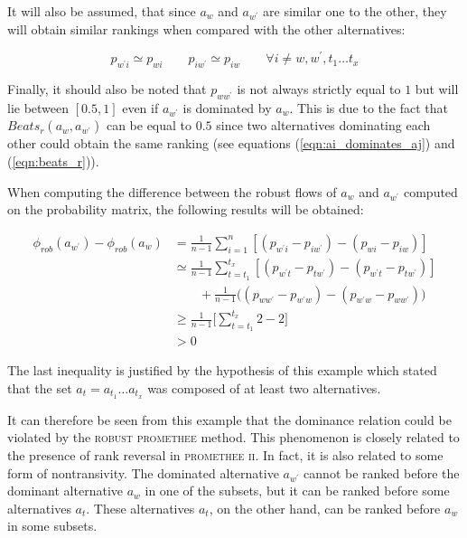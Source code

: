 It will also be assumed, that since $a_w$ and $a_{w^{\prime}}$ are similar one to the other, they will obtain similar rankings when compared with the other alternatives:

\begin{equation}
        p_{{w^{\prime}}i} \simeq p_{wi} \qquad p_{i{w^{\prime}}} \simeq p_{iw}   \qquad   \forall i \neq w, {w^{\prime}}, t_1 \dots t_x
    \label{eqn:p_wt}
\end{equation}

Finally, it should also be noted that $p_{ww^\prime}$ is not always strictly equal to $1$ but will lie between $[0.5, 1]$ even if $a_{w^\prime}$ is dominated by $a_w$.
This is due to the fact that $Beats_r(a_w, a_{w^\prime})$ can be equal to $0.5$ since two alternatives dominating each other could obtain the same ranking (see equations (\ref{eqn:ai_dominates_aj}) and (\ref{eqn:beats_r})).

When computing the difference between the robust flows of $a_w$ and $a_{w^{\prime}}$ computed on the probability matrix, the following results will be obtained:

\begin{equation}
    \begin{split}
        \phi_{rob}(a_{w^{\prime}}) - \phi_{rob}(a_w) & =
            \frac{1}{n-1} \sum\limits_{i=1}^n \left[ (p_{{w^{\prime}}i} - p_{i{w^{\prime}}}) -(p_{wi} - p_{iw}) \right] \\
        & \simeq \frac{1}{n-1} \sum\limits_{t=t_1}^{t_x} \left[(p_{{w^{\prime}}t} - p_{t{w^{\prime}}})
            - (p_{{w^{\prime}}t} - p_{t{w^{\prime}}}) \right] \\
        & \qquad + \frac{1}{n-1}\big((p_{ww^\prime} - p_{w^\prime w}) -  (p_{w^\prime w} - p_{ww^\prime})\big) \\
        & \ge \frac{1}{n-1}\big[\sum\limits_{t=t_1}^{t_x} 2 - 2\big] \\
        & > 0
    \end{split}
    \label{eqn:non_dominance}
\end{equation}

The last inequality is justified by the hypothesis of this example which stated that the set $a_t = a_{t_{1}} \dots a_{t_{x}}$ was composed of at least two alternatives.

It can therefore be seen from this example that the dominance relation could be violated by the \textsc{robust promethee} method.
This phenomenon is closely related to the presence of rank reversal in \textsc{promethee ii}. 
In fact, it is also related to some form of nontransivity.
The dominated alternative $a_{w^\prime}$ cannot be ranked before the dominant alternative $a_w$ in one of the subsets, but it can be ranked before some alternatives $a_t$. These alternatives $a_t$, on the other hand, can be ranked before $a_w$ in some subsets.

